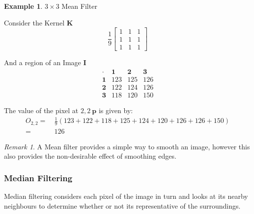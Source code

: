 \documentclass{article}
\theoremstyle{definition}
\newtheorem{ex}{Example}[subsection]
\theoremstyle{remark}
\newtheorem*{rem}{Remark}
\begin{document}
\begin{ex}$ 3 \times 3 $ Mean Filter

    \noindent Consider the Kernel $ \pmb{K} $
\begin{equation*}
    \frac{1}{9}\begin{bmatrix}
	1 & 1 & 1 \\
	1 & 1 & 1 \\
	1 & 1 & 1
    \end{bmatrix}
\end{equation*}

\noindent And a region of an Image $ \pmb{I} $\\

\begin{equation*}
\begin{matrix}
    \cdot & \pmb{1} & \pmb{2}  & \pmb{3} \\
    \pmb{1} & 123 & 125 & 126 \\ 
    \pmb{2} & 122 & 124 & 126 \\
    \pmb{3} & 118 & 120 & 150 
\end{matrix}
\end{equation*}

\noindent The value of the pixel at $ 2, 2\ \pmb{p} $ is given by:
\begin{align*}
    O_{2,2} = &\ \frac{1}{9}(123 + 122 + 118 + 125 + 124 + 120 + 126 + 126 + 150) \\
	    = &\ 126
\end{align*}
\end{ex}

\begin{rem}
    A Mean filter provides a simple way to smooth an image, however this also provides the non-desirable effect of smoothing edges.
\end{rem}

\subsubsection{Median Filtering}

Median filtering considers each pixel of the image in turn and looks at its nearby neighbours to determine whether or not its representative of the surroundings. 
\end{document}
